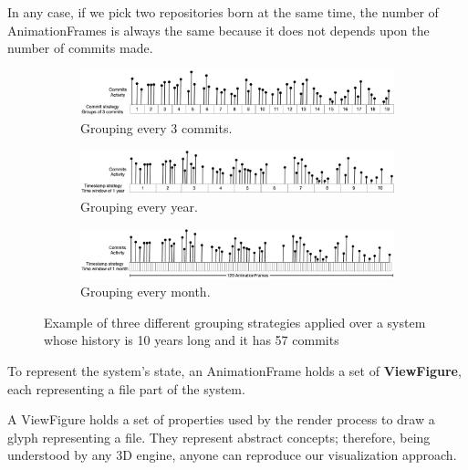 In any case, if we pick two repositories born at the same time, the number of AnimationFrames is always the same because it does not depends upon the number of commits made. 


\begin{figure}
    \begin{center}
        \begin{subfigure}{1\textwidth}
            \includegraphics[width=\linewidth]{TimeWindow1.jpg}
            \caption{Grouping every 3 commits.} 
            \label{fig:TimeWindow1}
        \end{subfigure}
        \begin{subfigure}{1\textwidth}
            \includegraphics[width=\linewidth]{TimeWindow2.jpg}
            \caption{Grouping every year.} 
            \label{fig:TimeWindow2}
        \end{subfigure}
        \begin{subfigure}{1\textwidth}
            \includegraphics[width=\linewidth]{TimeWindow3.jpg}
            \caption{Grouping every month.}
            \label{fig:TimeWindow3}
        \end{subfigure}
        \caption[Example of three different grouping strategies]{Example of three different grouping strategies applied over a system whose history is 10 years long and it has 57 commits}
        \label{fig:TimeWindowExamples}
    \end{center}
\end{figure}



To represent the system's state, an AnimationFrame holds a set of \textbf{ViewFigure}, each representing a file part of the system.

A ViewFigure holds a set of properties used by the render process to draw a glyph representing a file. They represent abstract concepts; therefore, being understood by any 3D engine, anyone can reproduce our visualization approach. 

